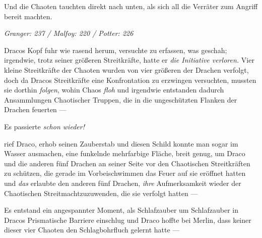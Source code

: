 Und die Chaoten tauchten direkt nach unten, als sich all die Verräter zum Angriff bereit machten.

\later

\emph{Granger: 237 / Malfoy: 220 / Potter: 226}

Dracos Kopf fuhr wie rasend herum, versuchte zu erfassen, was geschah; irgendwie, trotz seiner größeren Streitkräfte, hatte er \emph{die Initiative verloren.} Vier kleine Streitkräfte der Chaoten wurden von vier größeren der Drachen verfolgt, doch da Dracos Streitkräfte eine Konfrontation zu erzwingen versuchten, mussten sie dorthin \emph{folgen}, wohin Chaos \emph{floh} und irgendwie entstanden dadurch Ansammlungen Chaotischer Truppen, die in die ungeschützten Flanken der Drachen feuerten —

Es passierte \emph{schon wieder!}

 rief Draco, erhob seinen Zauberstab und diesen Schild konnte man sogar im Wasser ausmachen, eine funkelnde mehrfarbige Fläche, breit genug, um Draco und die anderen fünf Drachen an seiner Seite vor den Chaotischen Streitkräften zu schützen, die gerade im Vorbeischwimmen das Feuer auf sie eröffnet hatten und \emph{das} erlaubte den anderen fünf Drachen, \emph{ihre} Aufmerksamkeit wieder der Chaotischen Streitmachtzuzuwenden, die sie verfolgt hatten —

Es entstand ein angespannter Moment, als Schlafzauber um Schlafzauber in Dracos Prismatische Barriere einschlug und Draco hoffte bei Merlin, dass keiner dieser vier Chaoten den Schlagbohrfluch gelernt hatte —


